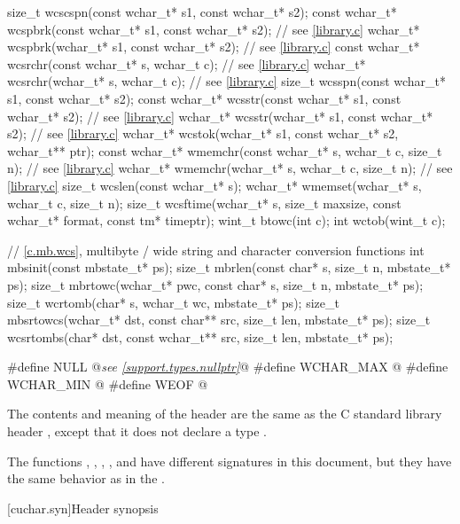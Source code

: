 \begin{codeblock}
{  size_t wcscspn(const wchar_t* s1, const wchar_t* s2);
  const wchar_t* wcspbrk(const wchar_t* s1, const wchar_t* s2); // see \ref{library.c}
  wchar_t* wcspbrk(wchar_t* s1, const wchar_t* s2);             // see \ref{library.c}
  const wchar_t* wcsrchr(const wchar_t* s, wchar_t c);          // see \ref{library.c}
  wchar_t* wcsrchr(wchar_t* s, wchar_t c);                      // see \ref{library.c}
  size_t wcsspn(const wchar_t* s1, const wchar_t* s2);
  const wchar_t* wcsstr(const wchar_t* s1, const wchar_t* s2);  // see \ref{library.c}
  wchar_t* wcsstr(wchar_t* s1, const wchar_t* s2);              // see \ref{library.c}
  wchar_t* wcstok(wchar_t* s1, const wchar_t* s2, wchar_t** ptr);
  const wchar_t* wmemchr(const wchar_t* s, wchar_t c, size_t n);    // see \ref{library.c}
  wchar_t* wmemchr(wchar_t* s, wchar_t c, size_t n);            // see \ref{library.c}
  size_t wcslen(const wchar_t* s);
  wchar_t* wmemset(wchar_t* s, wchar_t c, size_t n);
  size_t wcsftime(wchar_t* s, size_t maxsize, const wchar_t* format, const tm* timeptr);
  wint_t btowc(int c);
  int wctob(wint_t c);

  // \ref{c.mb.wcs}, multibyte / wide string and character conversion functions
  int mbsinit(const mbstate_t* ps);
  size_t mbrlen(const char* s, size_t n, mbstate_t* ps);
  size_t mbrtowc(wchar_t* pwc, const char* s, size_t n, mbstate_t* ps);
  size_t wcrtomb(char* s, wchar_t wc, mbstate_t* ps);
  size_t mbsrtowcs(wchar_t* dst, const char** src, size_t len, mbstate_t* ps);
  size_t wcsrtombs(char* dst, const wchar_t** src, size_t len, mbstate_t* ps);
}

#define NULL @\textit{see \ref{support.types.nullptr}}@
#define WCHAR_MAX @\seebelow@
#define WCHAR_MIN @\seebelow@
#define WEOF @\seebelow@
\end{codeblock}

\pnum
The contents and meaning of the header 
are the same as the C standard library header
, except that it does not declare a type .

\pnum
\begin{note}
The functions
, , , , and 
have different signatures in this document,
but they have the same behavior as in the .
\end{note}


[cuchar.syn]{Header  synopsis}

